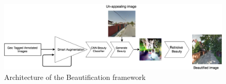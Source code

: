  \begin{figure}[ht]
	\centering
	\includegraphics[width=2\columnwidth]{Plot/UrbanEmotionspipeline.png}
	\caption{Architecture of the Beautification framework}
	\label{fig:framework}
\end{figure}

\par 

